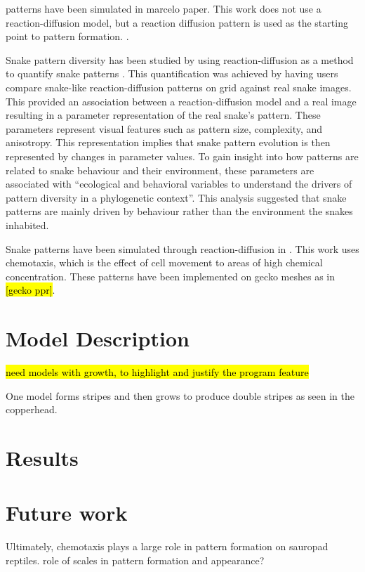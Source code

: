 patterns have been simulated in marcelo paper. This work does not use a reaction-diffusion model, but a reaction diffusion pattern is used as the starting point to pattern formation. \cite{pinheiro2017}.

Snake pattern diversity has been studied by using reaction-diffusion as a method to quantify snake patterns \cite{Allen2013}. This quantification was achieved by having users compare snake-like reaction-diffusion patterns on grid against real snake images. This provided an association between a reaction-diffusion model and a real image resulting in a parameter representation of the real snake’s pattern. These parameters represent visual features such as pattern size, complexity, and anisotropy. This representation implies that snake pattern evolution is then represented by changes in parameter values. To gain insight into how patterns are related to snake behaviour and their environment, these parameters are associated with “ecological and behavioral variables to understand the drivers of pattern diversity in a phylogenetic context”. This analysis suggested that snake patterns are mainly driven by behaviour rather than the environment the snakes inhabited. 

Snake patterns have been simulated through reaction-diffusion in \cite{MURRAY1991}. This work uses chemotaxis, which is the effect of cell movement to areas of high chemical concentration. These patterns have been implemented on gecko meshes as in \hl{[gecko ppr]}. 

\section{Model Description}
\hl{need models with growth, to highlight and justify the program feature}

One model forms stripes and then grows to produce double stripes as seen in the copperhead.

\section{Results}

\section{Future work}
Ultimately, chemotaxis plays a large role in pattern formation on sauropad reptiles.
role of scales in pattern formation and appearance?